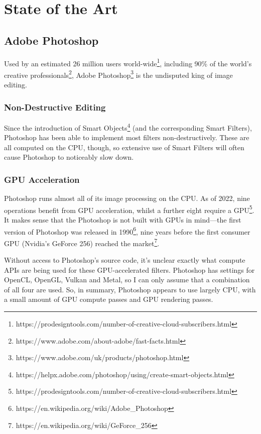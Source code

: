 \documentclass[12pt]{article}
\begin{document}
\pagebreak

\section{State of the Art} %

\subsection{Adobe Photoshop}

Used by an estimated 26 million users
world-wide\footnote{https://prodesigntools.com/number-of-creative-cloud-subscribers.html}, including
90\% of the world's creative
professionals\footnote{https://www.adobe.com/about-adobe/fast-facts.html}, Adobe
Photoshop\footnote{https://www.adobe.com/uk/products/photoshop.html} is the
undisputed king of image editing.

\subsubsection{Non-Destructive Editing}

Since the introduction of Smart
Objects\footnote{https://helpx.adobe.com/photoshop/using/create-smart-objects.html} (and the
corresponding Smart Filters), Photoshop has been able to implement most filters non-destructively.
These are all computed on the CPU, though, so extensive use of Smart Filters will often cause
Photoshop to noticeably slow down.

\subsubsection{GPU Acceleration}

Photoshop runs almost all of its image processing on the CPU.  As of 2022, nine operations benefit from
GPU acceleration, whilst a further eight require a
GPU\footnote{https://prodesigntools.com/number-of-creative-cloud-subscribers.html}.  It makes sense
that the Photoshop is not built with GPUs in mind---the first version of Photoshop was released in
1990\footnote{https://en.wikipedia.org/wiki/Adobe\_Photoshop}, nine years before the first consumer
GPU (Nvidia's GeForce 256) reached the market\footnote{https://en.wikipedia.org/wiki/GeForce\_256}.

Without access to Photoshop's source code, it's unclear exactly what compute APIs are being used for
these GPU-accelerated filters.  Photoshop has settings for OpenCL, OpenGL, Vulkan and Metal, so I
can only assume that a combination of all four are used.  So, in summary, Photoshop appears to use
largely CPU, with a small amount of GPU compute passes and GPU rendering passes.
\end{document}
